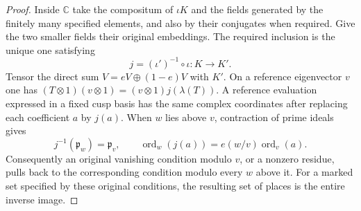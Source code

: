 \begin{proof}
Inside \(\mathbb C\) take the compositum of \(\iota K\) and the fields
generated by the finitely many specified elements, and also by their
conjugates when required. Give the two smaller fields their original
embeddings. The required inclusion is the unique one satisfying
\[
    j=(\iota')^{-1}\circ\iota:K\longrightarrow K'.
\]
Tensor the direct sum \(V=eV\oplus(1-e)V\) with \(K'\). On a
reference eigenvector \(v\) one has
\((T\otimes1)(v\otimes1)=(v\otimes1)j(\lambda(T))\).
A reference evaluation expressed in a fixed cusp basis has the same
complex coordinates after replacing each coefficient \(a\) by \(j(a)\).
When \(w\) lies above \(v\), contraction of prime ideals gives
\[
    j^{-1}(\mathfrak p_w)=\mathfrak p_v,\qquad
    \operatorname{ord}_w(j(a))=e(w/v)\operatorname{ord}_v(a).
\]
Consequently an original vanishing condition modulo \(v\), or a
nonzero residue, pulls back to the corresponding condition modulo
every \(w\) above it. For a marked set specified by these original
conditions, the resulting set of places is the entire inverse image.
\end{proof}

